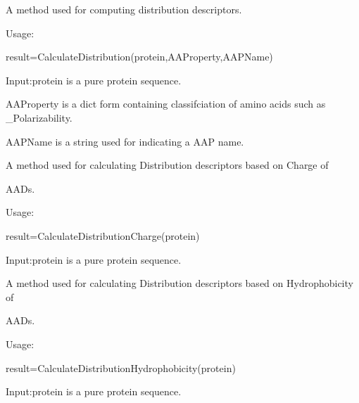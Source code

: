 \documentclass[letterpaper,10pt,english]{sphinxmanual}
\begin{document}
\begin{fulllineitems}
\label{reference/CTD:CTD.CalculateDistribution}
A method used for computing distribution descriptors.

Usage:

result=CalculateDistribution(protein,AAProperty,AAPName)

Input:protein is a pure protein sequence.

AAProperty is a dict form containing classifciation of amino acids such as \_Polarizability.

AAPName is a string used for indicating a AAP name.

\end{fulllineitems}


\begin{fulllineitems}
\label{reference/CTD:CTD.CalculateDistributionCharge}
A method used for calculating Distribution descriptors based on Charge of

AADs.

Usage:

result=CalculateDistributionCharge(protein)

Input:protein is a pure protein sequence.

\end{fulllineitems}


\begin{fulllineitems}
\label{reference/CTD:CTD.CalculateDistributionHydrophobicity}
A method used for calculating Distribution descriptors based on Hydrophobicity of

AADs.

Usage:

result=CalculateDistributionHydrophobicity(protein)

Input:protein is a pure protein sequence.

\end{fulllineitems}

\end{document}
